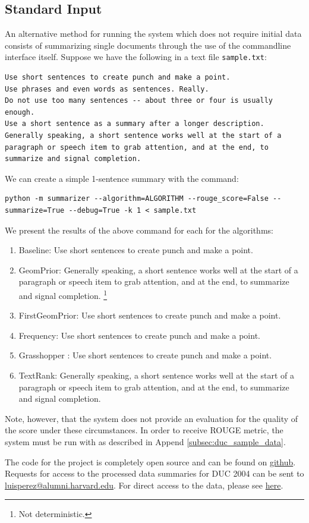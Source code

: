 \documentclass[11pt]{article}
\begin{document}
\subsection{Standard Input}
\label{subsec:standard_input}
An alternative method for running the system which does not require initial data consists of summarizing single documents through the use of the commandline interface itself. Suppose we have the following in a text file \verb|sample.txt|:
\begin{lstlisting}[breaklines]
Use short sentences to create punch and make a point.
Use phrases and even words as sentences. Really.
Do not use too many sentences -- about three or four is usually enough.
Use a short sentence as a summary after a longer description.
Generally speaking, a short sentence works well at the start of a paragraph or speech item to grab attention, and at the end, to summarize and signal completion.
\end{lstlisting}
We can create a simple 1-sentence summary with the command:
\begin{lstlisting}[breaklines]
python -m summarizer --algorithm=ALGORITHM --rouge_score=False --summarize=True --debug=True -k 1 < sample.txt
\end{lstlisting}
We present the results of the above command for each for the algorithms:
\begin{enumerate}
\item {\sc Baseline}: Use short sentences to create punch and make a point.
\item {\sc GeomPrior}: Generally speaking, a short sentence works well at the start of a paragraph or speech item to grab attention, and at the end, to summarize and signal completion. \footnote{Not deterministic.}
\item {\sc FirstGeomPrior}: Use short sentences to create punch and make a point.
\item {\sc Frequency}: Use short sentences to create punch and make a point.
\item {\sc Grasshopper }: Use short sentences to create punch and make a point.
\item {\sc TextRank}: Generally speaking, a short sentence works well at the start of a paragraph or speech item to grab attention, and at the end, to summarize and signal completion.
\end{enumerate}
Note, however, that the system does not provide an evaluation for the quality of the score under these circumstances. In order to receive ROUGE metric, the system must be run with as described in Append \ref{subsec:duc_sample_data}.

The code for the project is completely open source and can be found on \href{https://github.com/kandluis/document_summaries}{github}. Requests for access to the processed data summaries for DUC 2004 can be sent to \href{mailto:luisperez@alumni.harvard.edu}{luisperez@alumni.harvard.edu}. For direct access to the data, please see \href{https://www.dropbox.com/sh/dzmzh5nwe1i68ra/AABYPkOj6lXZln5I6tEDjpAna?dl=0}{here}.



\end{document}
